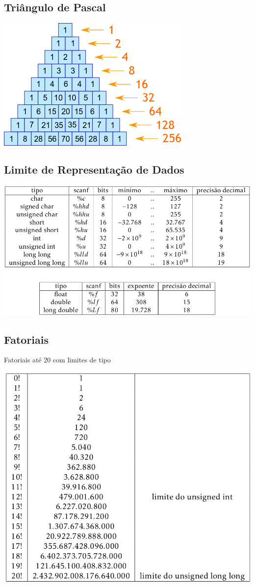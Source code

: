 \documentclass{article}
\begin{document}
\begin{multicols}{2}
\subsection{Triângulo de Pascal}
\includegraphics[scale=0.4]{pascal_triangle.png}

\subsection{Limite de Representação de Dados}
\includegraphics[scale=0.3]{limite_dados.png}

\subsection{Fatoriais}

Fatoriais até 20 com limites de tipo

\includegraphics[scale=0.4]{fatorial.png}


\end{multicols}
\end{document}
